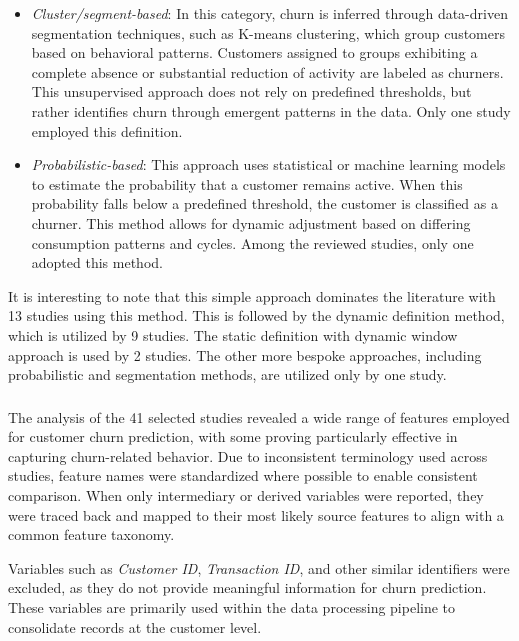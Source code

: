 \begin{itemize}
    \item \textit{Cluster/segment-based}: In this category, churn is inferred through data-driven segmentation techniques, such as K-means clustering, which group customers based on behavioral patterns. Customers assigned to groups exhibiting a complete absence or substantial reduction of activity are labeled as churners. This unsupervised approach does not rely on predefined thresholds, but rather identifies churn through emergent patterns in the data. Only one study employed this definition.
     
    \item \textit{Probabilistic-based}: This approach uses statistical or machine learning models to estimate the probability that a customer remains active. When this probability falls below a predefined threshold, the customer is classified as a churner. This method allows for dynamic adjustment based on differing consumption patterns and cycles. Among the reviewed studies, only one adopted this method.

\end{itemize}



It is interesting to note that this simple approach dominates the literature with 13 studies using this method. This is followed by the dynamic definition method, which is utilized by 9 studies. The static definition with dynamic window approach is used by 2 studies. The other more bespoke approaches, including probabilistic and segmentation methods, are utilized only by one study.

\subsubsection{\RSRQtwo}
\label{sec:RQ2}
The analysis of the 41 selected studies revealed a wide range of features employed for customer churn prediction,  with some proving particularly effective in capturing churn-related behavior. Due to inconsistent terminology used across studies, feature names were standardized where possible to enable consistent comparison. When only intermediary or derived variables were reported, they were traced back and mapped to their most likely source features to align with a common feature taxonomy.

Variables such as \textit{Customer ID}, \textit{Transaction ID}, and other similar identifiers were excluded, as they do not provide meaningful information for churn prediction. These variables are primarily used within the data processing pipeline to consolidate records at the customer level.

